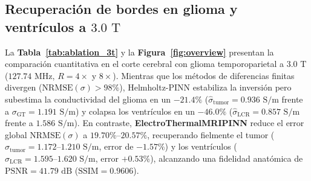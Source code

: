 \documentclass[9pt]{article}
\begin{document}
\subsection{Recuperación de bordes en glioma y ventrículos a \texorpdfstring{$3.0\text{ T}$}{3.0 T}}
La \textbf{Tabla~\ref{tab:ablation_3t}} y la \textbf{Figura~\ref{fig:overview}} presentan la comparación cuantitativa en el corte cerebral con glioma temporoparietal a $3.0\text{ T}$ ($127.74\text{ MHz}$, $R=4\times$ y $8\times$). Mientras que los métodos de diferencias finitas divergen ($\text{NRMSE}(\sigma) > 98\%$), Helmholtz-PINN estabiliza la inversión pero subestima la conductividad del glioma en un $-21.4\%$ ($\hat{\sigma}_{\text{tumor}} = 0.936\text{ S/m}$ frente a $\sigma_{\text{GT}} = 1.191\text{ S/m}$) y colapsa los ventrículos en un $-46.0\%$ ($\hat{\sigma}_{\text{LCR}} = 0.857\text{ S/m}$ frente a $1.586\text{ S/m}$). En contraste, \textbf{ElectroThermalMRIPINN} reduce el error global $\text{NRMSE}(\sigma)$ a $19.70\%\text{--}20.57\%$, recuperando fielmente el tumor ($\hat{\sigma}_{\text{tumor}} = 1.172\text{--}1.210\text{ S/m}$, error de $-1.57\%$) y los ventrículos ($\hat{\sigma}_{\text{LCR}} = 1.595\text{--}1.620\text{ S/m}$, error $+0.53\%$), alcanzando una fidelidad anatómica de $\text{PSNR} = 41.79\text{ dB}$ ($\text{SSIM} = 0.9606$).
\end{document}
